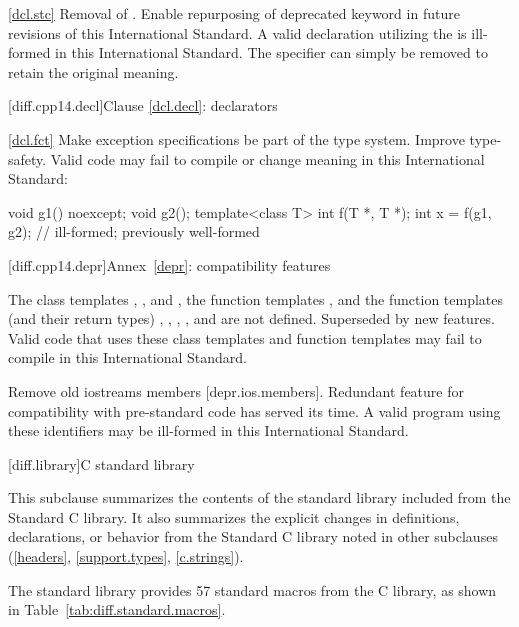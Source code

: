 \ref{dcl.stc}
%
\change Removal of  .
\rationale Enable repurposing of deprecated keyword in future revisions of this International Standard.
\effect
A valid \CppXIV declaration utilizing the 
 is ill-formed in this International Standard.
The specifier can simply be removed to retain the original meaning.

[diff.cpp14.decl]{Clause \ref{dcl.decl}: declarators}

\ref{dcl.fct}
\change Make exception specifications be part of the type system.
\rationale Improve type-safety.
\effect
Valid \CppXIV code may fail to compile or change meaning in this
International Standard:

\begin{codeblock}
void g1() noexcept;
void g2();
template<class T> int f(T *, T *);
int x = f(g1, g2);    // ill-formed; previously well-formed
\end{codeblock}

[diff.cpp14.depr]{Annex~\ref{depr}: compatibility features}

\change
The class templates
,
, and
,
the function templates
,
and the function templates (and their return types)
,
,
,
, and
are not defined.
\rationale Superseded by new features.
\effect Valid \CppXIV code that uses these class templates
and function templates may fail to compile in this International Standard.

\change
Remove old iostreams members [depr.ios.members].
\rationale Redundant feature for compatibility with pre-standard code
has served its time.
\effect A valid \CppXIV program using these identifiers
may be ill-formed in this International Standard.

[diff.library]{C standard library}
%

\pnum
This subclause summarizes the contents of the \Cpp standard library
included from the Standard C library.
It also summarizes the explicit changes in definitions,
declarations, or behavior from the Standard C library
noted in other subclauses (\ref{headers}, \ref{support.types}, \ref{c.strings}).

\pnum
The \Cpp standard library provides 57 standard macros from the C library,
as shown in Table~\ref{tab:diff.standard.macros}.

